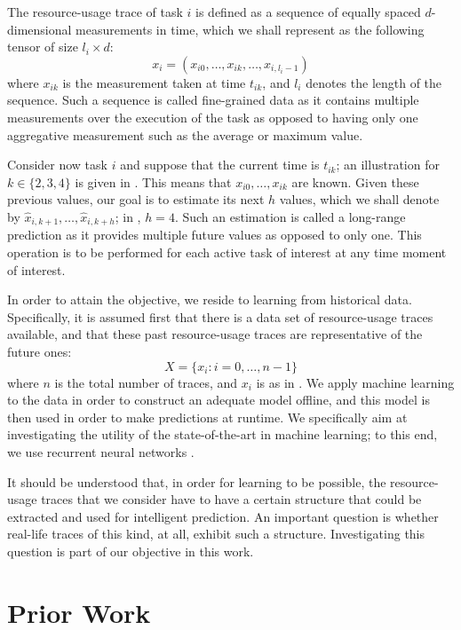 The resource-usage trace of task $i$ is defined as a sequence of equally spaced
$d$-dimensional measurements in time, which we shall represent as the following
tensor of size $l_i \times d$:
\[
  x_i = \left(x_{i0}, \dots, x_{ik}, \dots, x_{i,l_i - 1}\right)
\]
where $x_{ik}$ is the measurement taken at time $t_{ik}$, and $l_i$ denotes the
length of the sequence. Such a sequence is called fine-grained data as it
contains multiple measurements over the execution of the task as opposed to
having only one aggregative measurement such as the average or maximum value.

Consider now task $i$ and suppose that the current time is $t_{ik}$; an
illustration for $k \in \{2, 3, 4\}$ is given in . This means that
$x_{i0}, \dots, x_{ik}$ are known. Given these previous values, our goal is to
estimate its next $h$ values, which we shall denote by $\hat{x}_{i,k + 1},
\dots, \hat{x}_{i,k + h}$; in , $h = 4$. Such an estimation is
called a long-range prediction as it provides multiple future values as opposed
to only one. This operation is to be performed for each active task of interest
at any time moment of interest.

In order to attain the objective, we reside to learning from historical data.
Specifically, it is assumed first that there is a data set of resource-usage
traces available, and that these past resource-usage traces are representative
of the future ones:
\[
  X = \{ x_i: i = 0, \dots, n - 1 \}
\]
where $n$ is the total number of traces, and $x_i$ is as in . We
apply machine learning to the data in order to construct an adequate model
offline, and this model is then used in order to make predictions at runtime. We
specifically aim at investigating the utility of the state-of-the-art in machine
learning; to this end, we use recurrent neural networks \cite{goodfellow2016}.

It should be understood that, in order for learning to be possible, the
resource-usage traces that we consider have to have a certain structure that
could be extracted and used for intelligent prediction. An important question is
whether real-life traces of this kind, at all, exhibit such a structure.
Investigating this question is part of our objective in this work.

\section{Prior Work}

